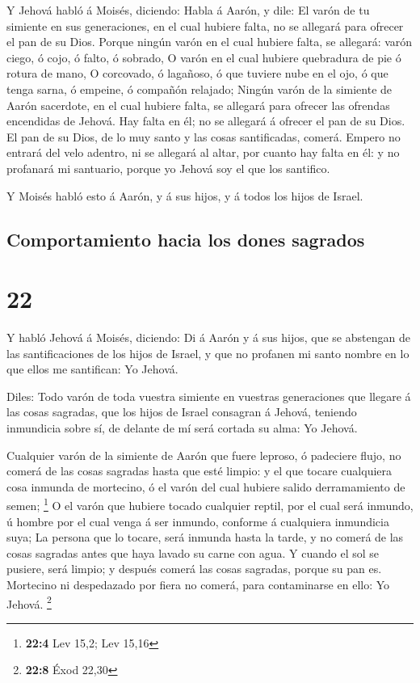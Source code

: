  Y Jehová habló á Moisés, diciendo:  Habla á
Aarón, y dile: El varón de tu simiente en sus generaciones, en el cual
hubiere falta, no se allegará para ofrecer el pan de su Dios.
 Porque ningún varón en el cual hubiere falta, se allegará:
varón ciego, ó cojo, ó falto, ó sobrado,  O varón en el
cual hubiere quebradura de pie ó rotura de mano,  O
corcovado, ó lagañoso, ó que tuviere nube en el ojo, ó que tenga sarna,
ó empeine, ó compañón relajado;  Ningún varón de la
simiente de Aarón sacerdote, en el cual hubiere falta, se allegará para
ofrecer las ofrendas encendidas de Jehová. Hay falta en él; no se
allegará á ofrecer el pan de su Dios.  El pan de su Dios,
de lo muy santo y las cosas santificadas, comerá.  Empero
no entrará del velo adentro, ni se allegará al altar, por cuanto hay
falta en él: y no profanará mi santuario, porque yo Jehová soy el que
los santifico.

 Y Moisés habló esto á Aarón, y á sus hijos, y á todos los
hijos de Israel.

\hypertarget{comportamiento-hacia-los-dones-sagrados}{%
\subsection{Comportamiento hacia los dones
sagrados}\label{comportamiento-hacia-los-dones-sagrados}}

\hypertarget{section-21}{%
\section{22}\label{section-21}}

 Y habló Jehová á Moisés, diciendo:  Di á Aarón
y á sus hijos, que se abstengan de las santificaciones de los hijos de
Israel, y que no profanen mi santo nombre en lo que ellos me santifican:
Yo Jehová.

 Diles: Todo varón de toda vuestra simiente en vuestras
generaciones que llegare á las cosas sagradas, que los hijos de Israel
consagran á Jehová, teniendo inmundicia sobre sí, de delante de mí será
cortada su alma: Yo Jehová.

 Cualquier varón de la simiente de Aarón que fuere leproso,
ó padeciere flujo, no comerá de las cosas sagradas hasta que esté
limpio: y el que tocare cualquiera cosa inmunda de mortecino, ó el varón
del cual hubiere salido derramamiento de semen; \footnote{\textbf{22:4}
  Lev 15,2; Lev 15,16}  O el varón que hubiere tocado
cualquier reptil, por el cual será inmundo, ú hombre por el cual venga á
ser inmundo, conforme á cualquiera inmundicia suya;  La
persona que lo tocare, será inmunda hasta la tarde, y no comerá de las
cosas sagradas antes que haya lavado su carne con agua.  Y
cuando el sol se pusiere, será limpio; y después comerá las cosas
sagradas, porque su pan es.  Mortecino ni despedazado por
fiera no comerá, para contaminarse en ello: Yo Jehová. \footnote{\textbf{22:8}
  Éxod 22,30}

